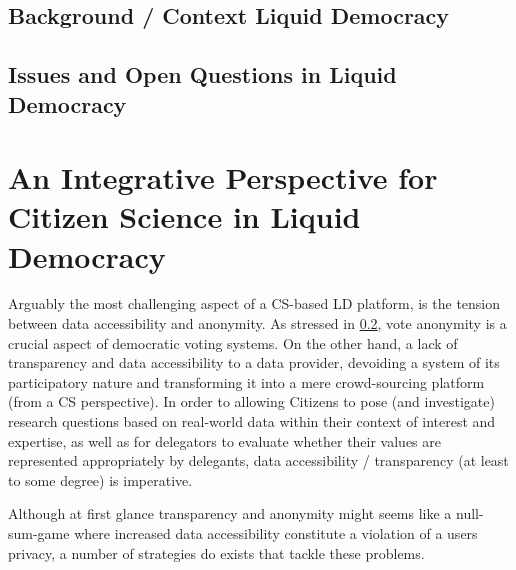 \subsection{Background / Context Liquid Democracy}
\label{ssec:Background_LD}
\subsection{Issues and Open Questions in Liquid Democracy}
\label{ssec:Issues_LD}
\section{An Integrative Perspective for Citizen Science in Liquid Democracy}
\label{sec:Integration_CSLD}
Arguably the most challenging aspect of a CS-based LD platform, is the tension between data accessibility and anonymity. As stressed  in \ref{ssec:Issues_LD}, vote anonymity is a crucial aspect of democratic voting systems. On the other hand, a lack of transparency and data accessibility  to a data provider, devoiding a system of its participatory nature and transforming it into a mere crowd-sourcing platform (from a CS perspective). In order to allowing Citizens to pose (and investigate) research questions based on real-world data within their context of interest and expertise, as well as for delegators to evaluate whether their values are represented appropriately by delegants, data accessibility / transparency (at least to some degree) is imperative.

Although at first glance transparency and anonymity might seems like a null-sum-game where increased data accessibility constitute a violation of a users privacy, a number of strategies do exists that tackle these problems.

